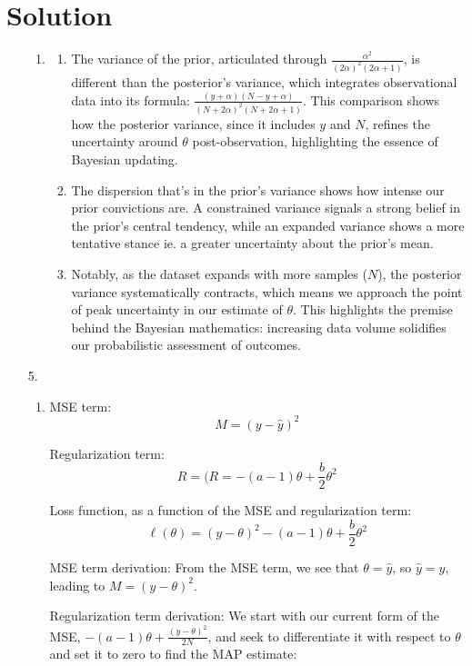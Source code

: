 \documentclass[submit]{harvardml}
\newenvironment{answer}
  {\section*{Solution}}
{}
\begin{document}
\begin{answer}
\begin{enumerate}
\begin{enumerate}
        \item
              \begin{enumerate}
                \item The variance of the prior, articulated through \(\frac{\alpha^2}{(2\alpha)^2(2\alpha+1)}\), is different than the posterior's variance, which integrates observational data into its formula: \(\frac{(y+\alpha)(N-y+\alpha)}{(N+2\alpha)^2(N+2\alpha+1)}\). This comparison shows how the posterior variance, since it includes \(y\) and \(N\), refines the uncertainty around \(\theta\) post-observation, highlighting the essence of Bayesian updating.
                \item The dispersion that's in the prior's variance shows how intense our prior convictions are.  A constrained variance signals a strong belief in the prior's central tendency, while an expanded variance shows a more tentative stance ie. a greater uncertainty about the prior's mean.
                \item Notably, as the dataset expands with more samples (\(N\)), the posterior variance systematically contracts, which means we approach the point of peak uncertainty in our estimate of \(\theta\). This highlights the premise behind the Bayesian mathematics: increasing data volume solidifies our probabilistic assessment of outcomes.
              \end{enumerate}

      \end{enumerate}

    \item[5.]

      \begin{enumerate}
        \item
              MSE term:
              \[
                M = (y - \hat{y})^2
              \]

              Regularization term:
              \[
                R = (R = -(a - 1)\theta + \frac{b}{2}\theta^2
              \]

              Loss function, as a function of the MSE and regularization term:
              \[
                \ell(\theta) = (y - \theta)^2 - (a - 1)\theta + \frac{b}{2}\theta^2
              \]

              MSE term derivation: From the MSE term, we see that \(\theta = \hat{y}\), so \(\hat{y} = y\), leading to \(M = (y - \theta)^2\).

              Regularization term derivation: We start with our current form of the MSE, \(-(a - 1)\theta + \frac{(y - \theta)^2}{2N}\), and seek to differentiate it with respect to \(\theta\) and set it to zero to find the MAP estimate:


\end{enumerate}
\end{enumerate}
\end{answer}
\end{document}

